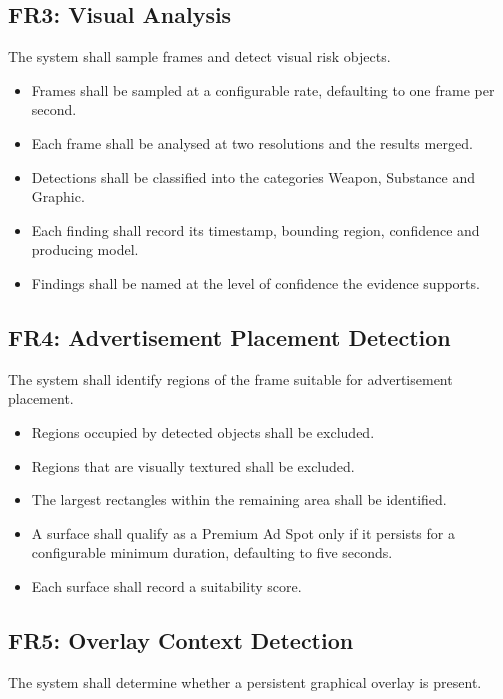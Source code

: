 \documentclass[12pt,a4paper,twoside]{report}
\begin{document}
\subsection{FR3: Visual Analysis}

The system shall sample frames and detect visual risk objects.

\begin{itemize}
\item Frames shall be sampled at a configurable rate, defaulting to one frame per second.
\item Each frame shall be analysed at two resolutions and the results merged.
\item Detections shall be classified into the categories Weapon, Substance and Graphic.
\item Each finding shall record its timestamp, bounding region, confidence and producing model.
\item Findings shall be named at the level of confidence the evidence supports.
\end{itemize}

\subsection{FR4: Advertisement Placement Detection}

The system shall identify regions of the frame suitable for advertisement placement.

\begin{itemize}
\item Regions occupied by detected objects shall be excluded.
\item Regions that are visually textured shall be excluded.
\item The largest rectangles within the remaining area shall be identified.
\item A surface shall qualify as a Premium Ad Spot only if it persists for a configurable minimum duration, defaulting to five seconds.
\item Each surface shall record a suitability score.
\end{itemize}

\subsection{FR5: Overlay Context Detection}

The system shall determine whether a persistent graphical overlay is present.
\end{document}
